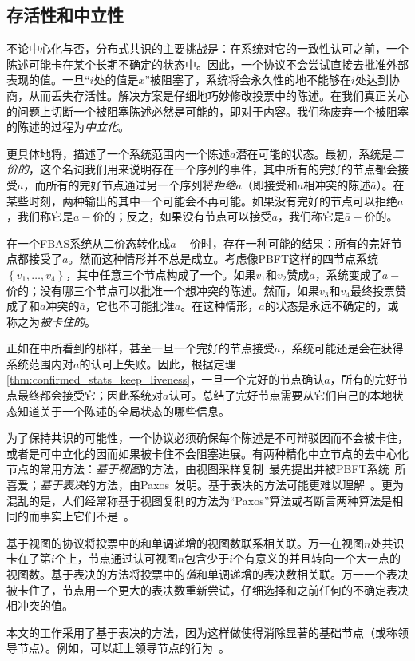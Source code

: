\subsection{存活性和中立性}\label{sec:vote_stuck}

不论中心化与否，分布式共识的主要挑战是：在系统对它的一致性认可之前，一个陈述可能卡在某个长期不确定的状态中。因此，一个协议不会尝试直接去批准外部表现的值。一旦``{\slot}$i$处的值是$x$''被阻塞了，系统将会永久性的地不能够在{\slot}$i$处达到协商，从而丢失存活性。解决方案是仔细地巧妙修改投票中的陈述。在我们真正关心的问题上切断一个被阻塞陈述必然是可能的，即对于{\slot}内容。我们称废弃一个被阻塞的陈述的过程为\textit{中立化}。

更具体地将，描述了一个系统范围内一个陈述$a$潜在可能的状态。最初，系统是\textit{二价的}，这个名词我们用来说明存在一个序列的事件，其中所有的完好的节点都会接受$a$，而所有的完好节点通过另一个序列将\textit{拒绝}$a$（即接受和$a$相冲突的陈述$\bar a$）。在某些时刻，两种输出的其中一个可能会不再可能。如果没有完好的节点可以拒绝$a$，我们称它是$a-$价的；反之，如果没有节点可以接受$a$，我们称它是$\bar a-$价的。

在一个FBAS系统从二价态转化成$a-\!\!$价时，存在一种可能的结果：所有的完好节点都接受了$a$。然而这种情形并不总是成立。考虑像PBFT这样的四节点系统$\left\{v_1,\ldots,v_4\right\}$，其中任意三个节点构成了一个{\quorum}。如果$v_1$和$v_2$赞成$a$，系统变成了$a-\!\!$价的；没有哪三个节点可以批准一个想冲突的陈述。然而，如果$v_3$和$v_4$最终投票赞成了和$a$冲突的$\bar a$，它也不可能批准$a$。在这种情形，$a$的状态是永远不确定的，或称之为\textit{被卡住的}。

正如在中所看到的那样，甚至一旦一个完好的节点接受$a$，系统可能还是会在获得系统范围内对$a$的认可上失败。因此，根据定理\ref{thm:confirmed_stats_keep_liveness}，一旦一个完好的节点确认$a$，所有的完好节点最终都会接受它；因此系统对$a$认可。总结了完好节点需要从它们自己的本地状态知道关于一个陈述的全局状态的哪些信息。

为了保持共识的可能性，一个协议必须确保每个陈述是不可辩驳因而不会被卡住，或者是可中立化的因而如果被卡住不会阻塞进展。有两种精化中立节点的去中心化节点的常用方法：\textit{基于视图}的方法，由视图采样复制~\cite{Oki:1988:VRN:62546.62549}最先提出并被PBFT系统~\cite{Castro:1999:PBFT}所喜爱；\textit{基于表决}的方法，由Paxos~\cite{Lamport:1998:PP:279227.279229}发明。基于表决的方法可能更难以理解~\cite{Ongaro:2014:SUC:2643634.2643666}。更为混乱的是，人们经常称基于视图复制的方法为``Paxos''算法或者断言两种算法是相同的而事实上它们不是~\cite{6894199}。

基于视图的协议将投票中的{\slot}和单调递增的视图数联系相关联。万一在视图$n$处共识卡在了第$i$个{\slot}上，节点通过认可视图$n$包含少于$i$个有意义的{\slot}并且转向一个大一点的视图数。基于表决的方法将投票中的\textit{值}和单调递增的表决数相关联。万一一个表决被卡住了，节点用一个更大的表决数重新尝试，仔细选择和之前任何的不确定表决相冲突的值。

本文的工作采用了基于表决的方法，因为这样做使得消除显著的基础节点（或称领导节点）。例如，可以赶上领导节点的行为~\cite{Lamport:2011:BPR:2075029.2075058}。
